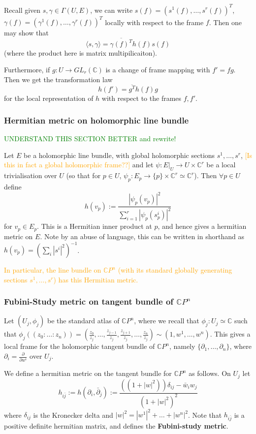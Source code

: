 \documentclass[a4paper]{article}
\theoremstyle{definition} \newtheorem*{definition}{Definition}
\theoremstyle{definition} \newtheorem*{definitions}{Definitions}
\theoremstyle{plain} \newtheorem{theorem}{Theorem}[section]
\theoremstyle{plain} \newtheorem{proposition}[theorem]{Proposition}
\theoremstyle{plain} \newtheorem{corollary}[theorem]{Corollary}
\theoremstyle{plain} \newtheorem{lemma}[theorem]{Lemma}
\theoremstyle{plain} \newtheorem{example}[theorem]{Example}
\newcommand{\understandBetter}[1]{\textcolor{orange}{#1}}
\newcommand{\question}[1]{\textcolor{orange}{#1}}
\newcommand{\finish}[1]{\textcolor{green}{#1}}
\newcommand{\defn}[1]{\textbf{#1}}
\newcommand{\complexnos}{\mathbb{C}}
\begin{document}
Recall given $s, \gamma\in \Gamma(U, E)$, we can write $s(f)=(s^1(f), \ldots, s^r(f))^T$, $\gamma(f)=(\gamma^1(f), \ldots, \gamma^r(f))^T$ locally with respect to the frame $f$. Then one may show that 
$$\langle s, \gamma \rangle = \overline{\gamma(f)^T}h(f)s(f)$$
(where the product here is matrix multipilicaiton).

Furthermore, if $g:U\to GL_r(\complexnos)$ is a change of frame mapping with $f'=fg$. Then we get the transformation law
$$h(f')=\overline{g^T}h(f)g$$
for the local representation of $h$ with respect to the frames $f, f'$.

\subsubsection{Hermitian metric on holomorphic line bundle}
\finish{UNDERSTAND THIS SECTION BETTER and rewrite!}

Let $E$ be a holomorphic line bundle, with global holomorphic sections $s^1, \ldots, s^r$, \question{[Is this in fact a global holomorphic frame??]} and let $\psi:E|_U\to U\times \complexnos^r$ be a local trivialisation over $U$ (so that for $p\in U$, $\psi_p:E_p\to \{p\}\times \complexnos^r \simeq \complexnos^r$). Then $\forall p\in U$ define
$$h(v_p):=\frac{|\psi_p(v_p)|^2}{\sum_{i=1}^r |\psi_p (s^i_p)|^2}$$
for $v_p\in E_p$. This is a Hermitian inner product at $p$, and hence gives a hermitian metric on $E$. Note by an abuse of language, this can be written in shorthand as $h(v_p)=(\sum_i |s^i|^2)^{-1}$.

\understandBetter{In particular, the line bundle on $\complexnos P^n$ (with its standard globally generating sections $s^1, \dots, s^r$) has this Hermitian metric.}

\subsubsection{Fubini-Study metric on tangent bundle of $\complexnos P^n$}
Let $(U_j, \phi_j)$ be the standard atlas of $\complexnos P^n$, where we recall that $\phi_j:U_j\simeq \complexnos$ such that $\phi_j((z_0 : \ldots : z_n))=(\frac{z_0}{z_j}, \ldots, \frac{z_{j-1}}{z_j}, \frac{z_{j+1}}{z_j}, \ldots, \frac{z_n}{z_j})\sim (1, w^1, \ldots, w^n)$. This gives a local frame for the holomorphic tangent bundle of $\complexnos P^n$, namely $\{\partial_1, \ldots, \partial_n\}$, where $\partial_i=\frac{\partial}{\partial w^i}$ over $U_j$. 

We define a hermitian metric on the tangent bundle for $\complexnos P^n$ as follows. On $U_j$ let
$$h_{i\bar{j}}:=h(\partial_i,\bar{\partial}_j):=\frac{((1+|w|^2))\delta_{ij}-\bar{w}
_i w_j}{(1+|w|^2)^2}$$
where $\delta_{ij}$ is the Kronecker delta and $|w|^2 = |w^1|^2 + \ldots + |w^n|^2$. Note that $h_{i\bar{j}}$ is a positive definite hermitian matrix, and defines the \defn{Fubini-study metric}. 
\end{document}
